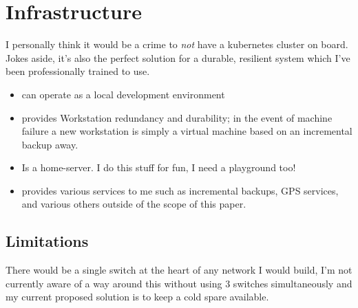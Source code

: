 \section{Infrastructure}


I personally think it would be a crime to \textit{not} have a kubernetes cluster on board. Jokes aside, it's also the perfect solution for a durable, resilient system which I've been professionally trained to use.
\begin{itemize}
    \item can operate as a local development environment
    \item provides Workstation redundancy and durability; in the event of machine failure a new workstation is simply a virtual machine based on an incremental backup away.
    \item Is a home-server. I do this stuff for fun, I need a playground too!
    \item provides various services to me such as incremental backups, GPS services, and various others outside of the scope of this paper.
\end{itemize}

\subsection{Limitations}

There would be a single switch at the heart of any network I would build, I'm not currently aware of a way around this without using 3 switches simultaneously and my current proposed solution is to keep a cold spare available.